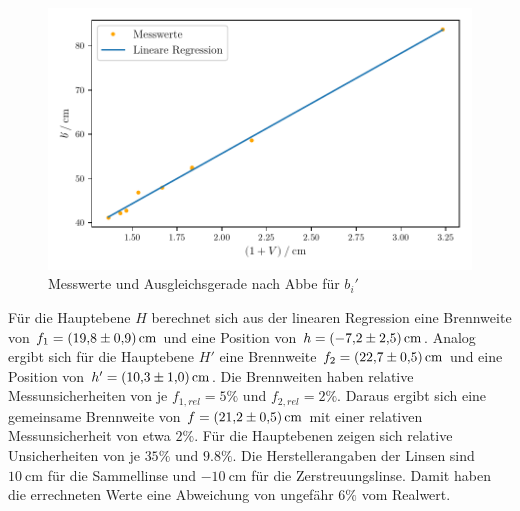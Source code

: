\begin{figure}
    \centering
    \includegraphics[width=.9\textwidth]{python/plotAbbe2.pdf}
    \caption{Messwerte und Ausgleichsgerade nach Abbe für $b_i'$}
    \label{fig:lin2}
\end{figure}

Für die Hauptebene $H$ berechnet sich aus der linearen Regression eine Brennweite von $f_1 = \SI{19.8\pm0.9}{\centi\meter}$ und eine Position von $h = \SI{-7.2\pm2.5}{\centi\meter}$.
Analog ergibt sich für die Hauptebene $H'$ eine Brennweite $f_2 = \SI{22.7\pm0.5}{\centi\meter}$ und eine Position von $h' = \SI{10.3\pm1.0}{\centi\meter}$.
Die Brennweiten haben relative Messunsicherheiten von je $f_{1, rel} = 5\%$ und $f_{2, rel} = 2\%$. Daraus ergibt sich eine gemeinsame Brennweite von 
$f = \SI{21.2\pm0.5}{\centi\meter}$ mit einer relativen Messunsicherheit von etwa $2\%$.
Für die Hauptebenen zeigen sich relative Unsicherheiten von je $35\%$ und $9.8\%$.
Die Herstellerangaben der Linsen sind $\SI{10}{\centi\meter}$ für die Sammellinse und $\SI{-10}{\centi\meter}$ für die Zerstreuungslinse. Damit haben die errechneten Werte eine Abweichung
von ungefähr $6\%$ vom Realwert.